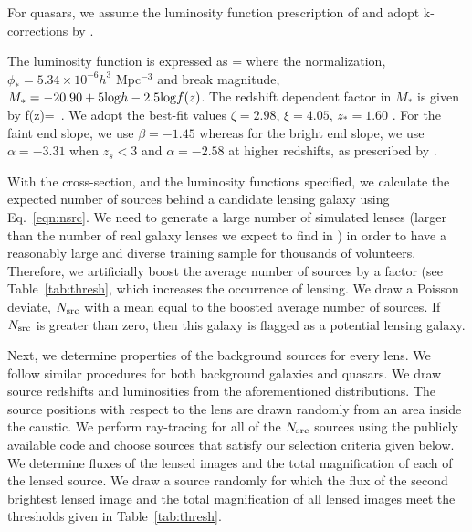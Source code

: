 \documentclass[useAMS,usenatbib,a4paper]{mn2e}
\begin{document}
For quasars, we assume the luminosity function prescription of \citep{Oguri2010}
and adopt k-corrections by \citep{Richards2006}.

The luminosity function is expressed as
\be
{}=
\ee
where the normalization, $\phi_{*}=5.34\times10^{-6} h^3$ Mpc$^{-3}$ and break
magnitude, $M_*=-20.90 + 5 {\rm log} h - 2.5 {\rm log} f(z)$. The redshift
dependent factor in $M_*$ is given by
\be
f(z)= \,.
\ee
We adopt the best-fit values $\zeta=2.98$, $\xi=4.05$, $z_{*}=1.60$
\citep{Oguri2010}. For the faint end slope, we use $\beta=-1.45$ whereas for
the bright end slope, we use $\alpha=-3.31$ when $z_s<3$ and $\alpha=-2.58$ at
higher redshifts, as prescribed by \citep{Oguri2010}.

With the cross-section, and the luminosity functions specified, we
calculate the expected number of sources behind a candidate lensing
galaxy using Eq.~\ref{eqn:nsrc}. We need to generate a large number of
simulated lenses (larger than the number of real galaxy lenses we expect
to find in \cfhtls) in order to have a reasonably large and diverse
training sample for thousands of \sw volunteers. Therefore, we
artificially boost the average number of sources by a factor (see
Table~\ref{tab:thresh}, which increases the occurrence of lensing. We
draw a Poisson deviate, $N_{\rm src}$ with a mean equal to the boosted
average number of sources. If $N_{\rm src}$ is greater than zero, then
this galaxy is flagged as a potential lensing galaxy.

Next, we determine properties of the background sources for every lens.
We follow similar procedures for both background galaxies and quasars.
We draw source redshifts and luminosities from the aforementioned
distributions. The source positions with respect to the lens are drawn
randomly from an area inside the caustic.  We perform ray-tracing for
all of the $N_{\rm src}$ sources using the publicly available code
\gravlens \citep{Keeton2000} and choose sources that satisfy our
selection criteria given below. We determine fluxes of the lensed images and the
total magnification of each of the lensed source. We draw a
source randomly for which the flux of the second brightest lensed image and the
total magnification of all lensed images meet the thresholds given
in Table~\ref{tab:thresh}.
\end{document}
